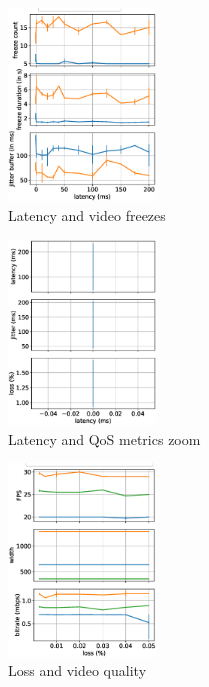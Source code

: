 \begin{figure}[]
    \includegraphics[width=0.35\textwidth,keepaspectratio]{../figures/static/latency_freeze_meet_teams.eps}
    \caption{Latency and video freezes}
    \label{fig:latency_freeze}
\end{figure}


\begin{figure}[]
    \includegraphics[width=0.35\textwidth,keepaspectratio]{../figures/static/latency_latency_zoom.eps}
    \caption{Latency and QoS metrics zoom}
    \label{fig:latency_qos}
\end{figure}


\begin{figure}[]
    \includegraphics[width=0.35\textwidth,keepaspectratio]{../figures/static/loss_qos_meet_teams_zoom.eps}
    \caption{Loss and video quality}
    \label{fig:loss_video_qual}
\end{figure}


